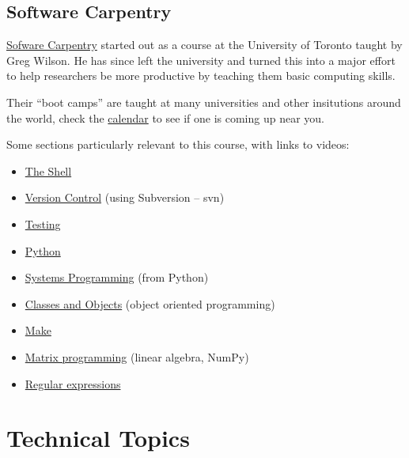 \documentclass[letterpaper,10pt,english]{sphinxmanual}
\begin{document}
\section{Software Carpentry}
\label{software_carpentry:software-carpentry}\label{software_carpentry::doc}\label{software_carpentry:id1}
\href{http://software-carpentry.org}{Sofware Carpentry}
started out as a course at the University of Toronto
taught by Greg Wilson.  He has since left the university and turned this
into a major effort to help researchers be more productive by teaching them
basic computing skills.

Their ``boot camps'' are taught at many universities and other insitutions
around the world, check the \href{http://software-carpentry.org/bootcamps/index.html\#calendar}{calendar} to see if
one is coming up near you.

Some sections particularly relevant to this course, with links to videos:
\begin{itemize}
\item {} 
\href{http://software-carpentry.org/4\_0/shell/}{The Shell}

\item {} 
\href{http://software-carpentry.org/4\_0/vc/}{Version Control}
(using Subversion -- svn)

\item {} 
\href{http://software-carpentry.org/4\_0/test/}{Testing}

\item {} 
\href{http://software-carpentry.org/4\_0/python/}{Python}

\item {} 
\href{http://software-carpentry.org/4\_0/sysprog/}{Systems Programming}
(from Python)

\item {} 
\href{http://software-carpentry.org/4\_0/oop/}{Classes and Objects}
(object oriented programming)

\item {} 
\href{http://software-carpentry.org/4\_0/make/}{Make}

\item {} 
\href{http://software-carpentry.org/4\_0/matrix/}{Matrix programming} (linear
algebra, NumPy)

\item {} 
\href{http://software-carpentry.org/4\_0/regexp/}{Regular expressions}

\end{itemize}


\chapter{Technical Topics}
\label{index:toc-technical-topics}\label{index:technical-topics}
\end{document}
